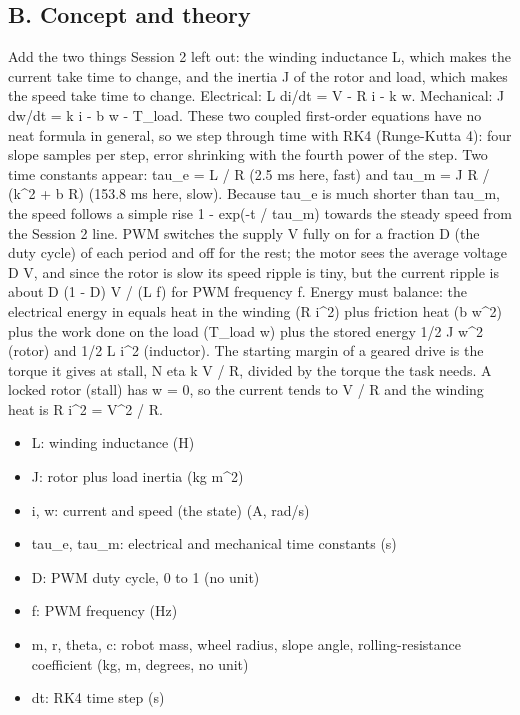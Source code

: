 \documentclass[11pt,a4paper]{article}
\begin{document}
\subsection*{B. Concept and theory}
Add the two things Session 2 left out: the winding inductance L, which makes the current take time to change, and the inertia J of the rotor and load, which makes the speed take time to change. Electrical: L di/dt = V - R i - k w. Mechanical: J dw/dt = k i - b w - T\_load. These two coupled first-order equations have no neat formula in general, so we step through time with RK4 (Runge-Kutta 4): four slope samples per step, error shrinking with the fourth power of the step. Two time constants appear: tau\_e = L / R (2.5 ms here, fast) and tau\_m = J R / (k\textasciicircum{}2 + b R) (153.8 ms here, slow). Because tau\_e is much shorter than tau\_m, the speed follows a simple rise 1 - exp(-t / tau\_m) towards the steady speed from the Session 2 line. PWM switches the supply V fully on for a fraction D (the duty cycle) of each period and off for the rest; the motor sees the average voltage D V, and since the rotor is slow its speed ripple is tiny, but the current ripple is about D (1 - D) V / (L f) for PWM frequency f. Energy must balance: the electrical energy in equals heat in the winding (R i\textasciicircum{}2) plus friction heat (b w\textasciicircum{}2) plus the work done on the load (T\_load w) plus the stored energy 1/2 J w\textasciicircum{}2 (rotor) and 1/2 L i\textasciicircum{}2 (inductor). The starting margin of a geared drive is the torque it gives at stall, N eta k V / R, divided by the torque the task needs. A locked rotor (stall) has w = 0, so the current tends to V / R and the winding heat is R i\textasciicircum{}2 = V\textasciicircum{}2 / R.

\begin{itemize}[nosep]
\item L: winding inductance (H)
\item J: rotor plus load inertia (kg m\textasciicircum{}2)
\item i, w: current and speed (the state) (A, rad/s)
\item tau\_e, tau\_m: electrical and mechanical time constants (s)
\item D: PWM duty cycle, 0 to 1 (no unit)
\item f: PWM frequency (Hz)
\item m, r, theta, c: robot mass, wheel radius, slope angle, rolling-resistance coefficient (kg, m, degrees, no unit)
\item dt: RK4 time step (s)
\end{itemize}
\end{document}

